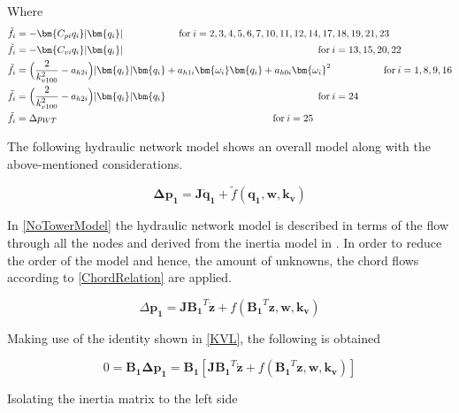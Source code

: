 Where\\
\begin{align}
\tilde{f}_i &= -\bm{C_{pi} q_i} |\bm{q_i}|  \hskip 2cm  \text{for}\: i = 2,3,4,5,6,7,10,11,12,14,17,18,19,21,23 \\
\tilde{f}_i &= -\bm{C_{vi} q_i} |\bm{q_i}|  \hspace{6.95cm} \text{for}\:i = 13,15,20,22\\
\tilde{f}_i &= \Big(\frac{2}{k_{v100}^2} - a_{h2i}\Big)|\bm{q_i}| \bm{q_i}  + a_{h1i} \bm{\omega_{i}} \bm{q_i} + a_{h0i}\bm{{\omega_i}}^2 \hspace{1.875cm} \text{for}\: i = 1,8,9,16 \\
\tilde{f}_i &= \Big(\frac{2}{k_{v100}^2} - a_{h2i}\Big)|\bm{q_i}| \bm{q_i}  \hspace{5.43cm} \text{for}\: i = 24 \\
\tilde{f}_i &= \Delta p_{WT}  \hspace{7.69cm} \text{for}\:i = 25
\end{align}

The following hydraulic network model shows an overall model along with the above-mentioned considerations.%

\begin{equation}
  \bm{\Delta p_1} =  \bm{J} \bm{\dot{q}_1} + \tilde{f}(\bm{q_1}, \bm{w}, \bm{k_v})
  \label{NoTowerModel}
\end{equation}

In \eqref{NoTowerModel} the hydraulic network model is described in terms of the 
flow through all the nodes and derived from the inertia model in . In order to reduce the order of the model and hence, 
the amount of unknowns, the chord flows according to \eqref{ChordRelation} are applied. 

\begin{equation}
  \Delta \bm{p_1} =  \bm{J} {\bm{B_1}}^T \bm{\dot{z}} + f({\bm{B_1}}^T \bm{z}, \bm{w}, \bm{k_v})
  \label{ChordsModel}
\end{equation}

Making use of the identity shown in \eqref{KVL}, the following is obtained

\begin{equation}
  0 = \bm{B_1} \bm{\Delta p_1} = \bm{B_1} [ \bm{J {B_1}}^T \bm{\dot{z}} + f({\bm{B_1}}^T \bm{z}, \bm{w}, \bm{k_v})] 
 \end{equation}

Isolating the inertia matrix to the left side

